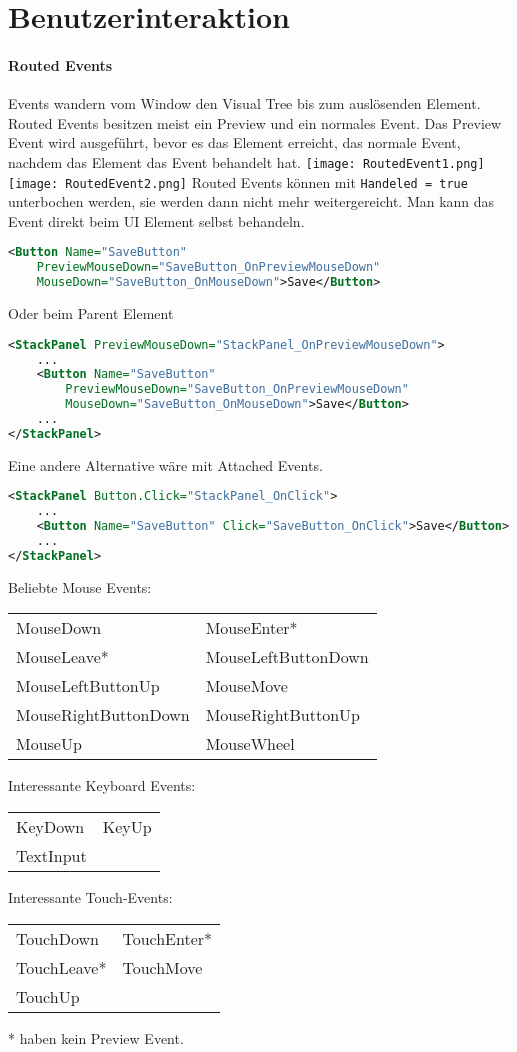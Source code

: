 \section{Benutzerinteraktion}
\paragraph{Routed Events} Events wandern vom Window den Visual Tree bis zum auslösenden Element. Routed Events besitzen meist ein Preview und ein normales Event. Das Preview Event wird ausgeführt, bevor es das Element erreicht, das normale Event, nachdem das Element das Event behandelt hat.
\texttt{[image: RoutedEvent1.png]}
\texttt{[image: RoutedEvent2.png]}
Routed Events können mit \verb+Handeled = true+ unterbochen werden, sie werden dann nicht mehr weitergereicht. Man kann das Event direkt beim UI Element selbst behandeln.
\begin{lstlisting}[language=xml]
<Button Name="SaveButton"
    PreviewMouseDown="SaveButton_OnPreviewMouseDown"
    MouseDown="SaveButton_OnMouseDown">Save</Button>
\end{lstlisting}
Oder beim Parent Element
\begin{lstlisting}[language=xml]
<StackPanel PreviewMouseDown="StackPanel_OnPreviewMouseDown">
    ...
    <Button Name="SaveButton"
        PreviewMouseDown="SaveButton_OnPreviewMouseDown"
        MouseDown="SaveButton_OnMouseDown">Save</Button>
    ...
</StackPanel>
\end{lstlisting}
Eine andere Alternative wäre mit Attached Events.
\begin{lstlisting}[language=xml]
<StackPanel Button.Click="StackPanel_OnClick">
    ...
    <Button Name="SaveButton" Click="SaveButton_OnClick">Save</Button>
    ...
</StackPanel>
\end{lstlisting}
Beliebte Mouse Events:
\begin{tabular}{ll}
MouseDown & MouseEnter* \\
MouseLeave* & MouseLeftButtonDown \\
MouseLeftButtonUp & MouseMove \\
MouseRightButtonDown & MouseRightButtonUp \\
MouseUp & MouseWheel
\end{tabular}
Interessante Keyboard Events:
\begin{tabular}{ll}
KeyDown & KeyUp \\
TextInput & 
\end{tabular}
Interessante Touch-Events:
\begin{tabular}{ll}
TouchDown & TouchEnter* \\
TouchLeave* & TouchMove \\
TouchUp & 
\end{tabular}
* haben kein Preview Event.
